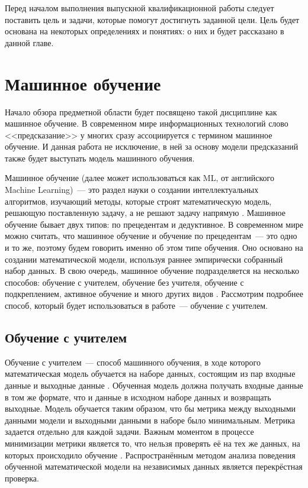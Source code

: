 Перед началом выполнения выпускной квалификационной работы следует поставить цель и задачи, которые помогут достигнуть заданной цели. Цель будет основана на некоторых определениях и понятиях: о них и будет рассказано в данной главе.
\section{Машинное обучение}
Начало обзора предметной области будет посвящено такой дисциплине как машинное обучение. В современном мире информационных технологий слово <<предсказание>> у многих сразу ассоциируется с термином машинное обучение. И данная работа не исключение, в ней за основу модели предсказаний также будет выступать модель машинного обучения. 

Машинное обучение (далее может использоваться как ML, от английского Machine Learning)~--- это раздел науки о создании интеллектуальных алгоритмов, изучающий методы, которые строят математическую модель, решающую поставленную задачу, а не решают задачу напрямую \cite{ml-main-book}. Машинное обучение бывает двух типов: по прецедентам и дедуктивное. В современном мире можно считать, что машинное обучение и обучение по прецедентам~--- это одно и то же, поэтому будем говорить именно об этом типе обучения. Оно основано на создании математической модели, используя раннее эмпирически собранный набор данных. В свою очередь, машинное обучение подразделяется на несколько способов: обучение с учителем, обучение без учителя, обучение с подкреплением, активное обучение и много других видов \cite{ml-methods-book}. Рассмотрим подробнее способ, который будет использоваться в работе~--- обучение с учителем.
    \subsection{Обучение с учителем}
Обучение с учителем~--- способ машинного обучения, в ходе которого математическая модель обучается на наборе данных, состоящим из пар входные данные и выходные данные \cite{ml-methods-book}. Обученная модель должна получать входные данные в том же формате, что и данные в исходном наборе данных и возвращать выходные. Модель обучается таким образом, что бы метрика между выходными данными модели и выходными данными в наборе было минимальным. Метрика задается отдельно для каждой задачи. Важным моментом в процессе минимизации метрики является то, что нельзя проверять её на тех же данных, на которых происходило обучение \cite{cross-validation-article}. Распространённым методом анализа поведения обученной математической модели на независимых данных является перекрёстная проверка. 
